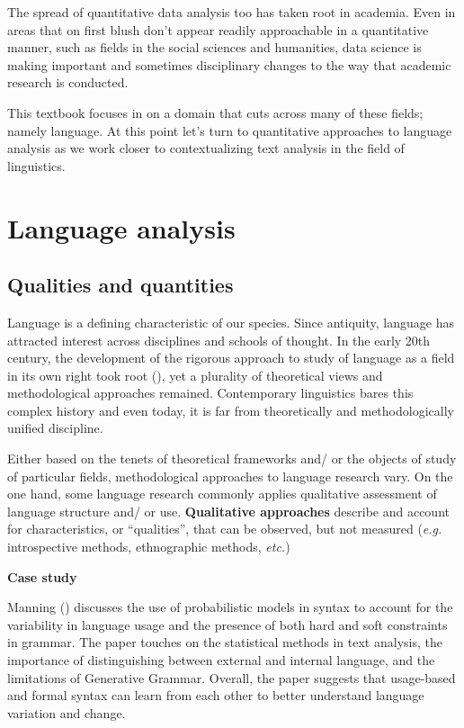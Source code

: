 \documentclass[
  letterpaper,
  krantz1]{latex/krantz-mod}
\theoremstyle{definition}
\theoremstyle{definition}
\theoremstyle{remark}
\begin{document}
The spread of quantitative data analysis too has taken root in academia.
Even in areas that on first blush don't appear readily approachable in a
quantitative manner, such as fields in the social sciences and
humanities, data science is making important and sometimes disciplinary
changes to the way that academic research is conducted.

This textbook focuses in on a domain that cuts across many of these
fields; namely language. At this point let's turn to quantitative
approaches to language analysis as we work closer to contextualizing
text analysis in the field of linguistics.

\section{Language analysis}\label{language-analysis}

\subsection{Qualities and quantities}\label{qualities-and-quantities}

Language is a defining characteristic of our species. Since antiquity,
language has attracted interest across disciplines and schools of
thought. In the early 20th century, the development of the rigorous
approach to study of language as a field in its own right took root
(), yet a plurality of
theoretical views and methodological approaches remained. Contemporary
linguistics bares this complex history and even today, it is far from
theoretically and methodologically unified discipline.

Either based on the tenets of theoretical frameworks and/ or the objects
of study of particular fields, methodological approaches to language
research vary. On the one hand, some language research commonly applies
qualitative assessment of language structure and/ or use.
\textbf{Qualitative approaches} describe and account for
characteristics, or ``qualities'', that can be observed, but not
measured (\emph{e.g.} introspective methods, ethnographic methods,
\emph{etc.})

\pagebreak

\begin{tcolorbox}[enhanced jigsaw, leftrule=.75mm, colframe=quarto-callout-color-frame, left=2mm, colback=white, toprule=.15mm, breakable, arc=.35mm, opacityback=0, bottomrule=.15mm, rightrule=.15mm]

\textbf{ Case study}

Manning () discusses the use of
probabilistic models in syntax to account for the variability in
language usage and the presence of both hard and soft constraints in
grammar. The paper touches on the statistical methods in text analysis,
the importance of distinguishing between external and internal language,
and the limitations of Generative Grammar. Overall, the paper suggests
that usage-based and formal syntax can learn from each other to better
understand language variation and change.

\end{tcolorbox}
\end{document}
